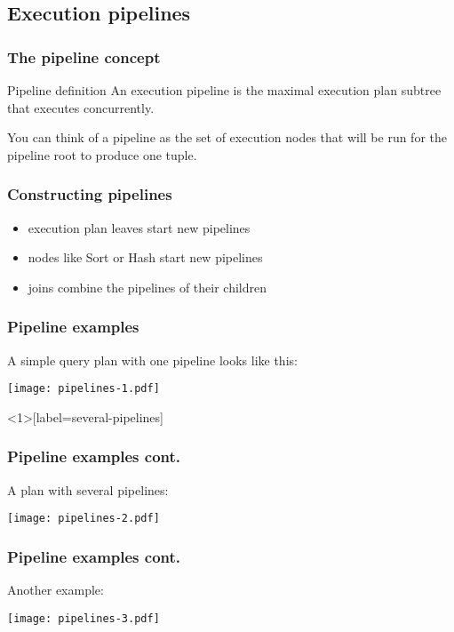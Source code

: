 \documentclass{beamer}
\begin{document}
\subsection{Execution pipelines}

\begin{frame}
  \frametitle{The pipeline concept}

  \begin{block}{Pipeline definition}
    An execution pipeline is the maximal execution plan subtree that executes
    concurrently.
  \end{block}

  \bigskip

  You can think of a pipeline as the set of execution nodes that will be run
  for the pipeline root to produce one tuple.
\end{frame}

\begin{frame}
  \frametitle{Constructing pipelines}

  \begin{itemize}
  \item execution plan leaves start new pipelines
  \item nodes like Sort or Hash start new pipelines
  \item joins combine the pipelines of their children
  \end{itemize}
\end{frame}

\begin{frame}
  \frametitle{Pipeline examples}

  A simple query plan with one pipeline looks like this:
  \begin{center}
    \texttt{[image: pipelines-1.pdf]}
  \end{center}
\end{frame}

\begin{frame}<1>[label=several-pipelines]
  \frametitle{Pipeline examples cont.}

  A plan with several pipelines:
  \begin{center}
    \texttt{[image: pipelines-2.pdf]}
  \end{center}
\end{frame}

\begin{frame}
  \frametitle{Pipeline examples cont.}

  Another example:
  \begin{center}
    \texttt{[image: pipelines-3.pdf]}
  \end{center}
\end{frame}
\end{document}
